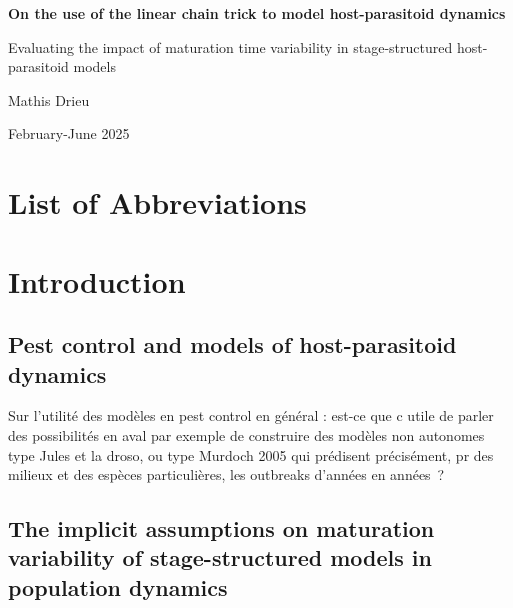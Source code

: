 \documentclass[12pt,a4paper,onecolumn]{article}
\newcommand{\noPageNumber}{\thispagestyle{empty}}
\begin{document}

\noPageNumber
\begin{titlepage}
\centering
\vspace*{3cm}
{\Huge \bfseries On the use of the linear chain trick to model host-parasitoid dynamics \par}
{\Huge Evaluating the impact of maturation time variability in stage-structured host-parasitoid models \par}
\vspace{2cm}
{\Large Mathis Drieu \par}
\vfill
February-June 2025
\end{titlepage}

\noPageNumber
\begin{abstract}
xxx
\end{abstract}

\noPageNumber
\tableofcontents
\newpage
\noPageNumber

\section*{List of Abbreviations}
\noPageNumber

\newpage
\setcounter{page}{1}







\section{Introduction}

\subsection{Pest control and models of host-parasitoid dynamics}
Sur l'utilité des modèles en pest control en général : est-ce que c utile de parler des possibilités en aval par exemple de construire des modèles non autonomes type Jules et la droso, ou type Murdoch 2005 qui prédisent précisément, pr des milieux et des espèces particulières, les outbreaks d’années en années ? 

\subsection{The implicit assumptions on maturation variability of stage-structured models in population dynamics}
\end{document}
